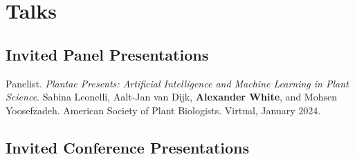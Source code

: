 \documentclass[letterpaper]{article}
\newenvironment{biblist}{%
   \begin{list}{}{%
     \setlength{\labelwidth}{0pt}%
     \setlength{\labelsep}{1em}%
     \setlength{\leftmargin}{2em}%
     \setlength{\itemindent}{-1em}%
   }
}{\end{list}}
\begin{document}
\section*{Talks}
\subsection*{Invited Panel Presentations}
\begin{biblist}
\item Panelist. \textit{Plantae Presents: Artificial Intelligence and Machine Learning in Plant Science}. Sabina Leonelli, Aalt-Jan van Dijk, \textbf{Alexander White}, and Mohsen Yoosefzadeh. American Society of Plant Biologists. Virtual, January 2024.
\end{biblist}

\subsection*{Invited Conference Presentations}
\end{document}
